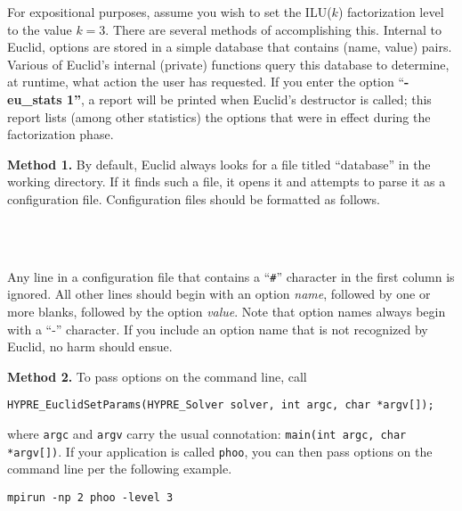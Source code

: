 For expositional purposes, assume you wish to set the ILU($k$)
factorization level to the value $k = 3$.
There are several methods of accomplishing this.
Internal to Euclid, options are stored in a simple database that
contains (name, value) pairs.
Various of Euclid's internal (private) functions query this
database to determine, at runtime, what action the user
has requested.
If you enter the option ``{\bf -eu\_stats 1''}, a report will
be printed when Euclid's destructor is called; this
report lists (among other statistics) the options that
were in effect during the factorization phase.

{\bf Method 1.}
By default, Euclid always looks for a file titled
``database'' in the working directory. 
If it finds such a file, it opens it and attempts to parse it as
a configuration file.
Configuration files should be formatted as follows. 

\vspace{0.1in}
 \\
 \\
\vspace{0.1in}

Any line in a configuration file that contains a ``{\tt \#}''
character in the first column is ignored.
All other lines should begin with an option {\em name}, followed by
one or more blanks, followed by the option {\em value}.
Note that option names always begin with a ``-'' character.
If you include an option name that is not recognized by Euclid,
no harm should ensue.

{\bf Method 2.}
To pass options on the command line, call
\begin{display}
\begin{verbatim}
HYPRE_EuclidSetParams(HYPRE_Solver solver, int argc, char *argv[]);
\end{verbatim}
\end{display}
where {\tt argc} and {\tt argv} carry the usual connotation:
{\tt main(int argc, char *argv[])}.
If your \hypre{} application is called {\tt phoo}, you can
then pass options on the command line per the following example.

\begin{display}
\begin{verbatim}
mpirun -np 2 phoo -level 3
\end{verbatim}
\end{display}

